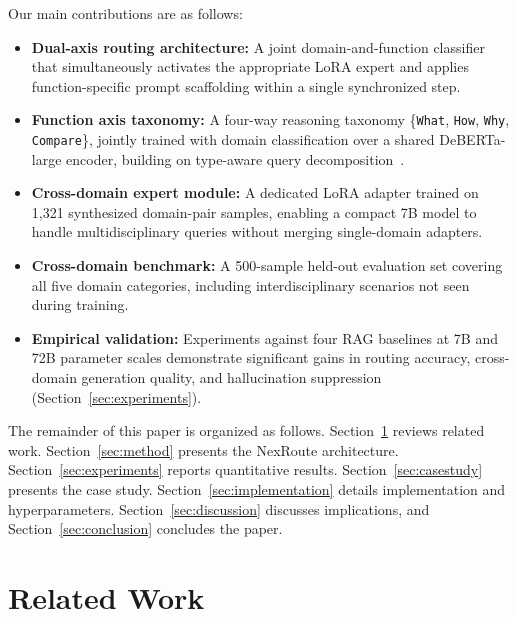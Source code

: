 \documentclass[a4paper,fleql]{cas-sc}
\begin{document}
Our main contributions are as follows:
\begin{itemize}
    \item \textbf{Dual-axis routing architecture:} A joint domain-and-function
    classifier that simultaneously activates the appropriate LoRA expert and
    applies function-specific prompt scaffolding within a single synchronized
    step.

    \item \textbf{Function axis taxonomy:} A four-way reasoning taxonomy
    \{\texttt{What}, \texttt{How}, \texttt{Why}, \texttt{Compare}\}, jointly
    trained with domain classification over a shared DeBERTa-large encoder,
    building on type-aware query decomposition~\citep{typedrag}.

    \item \textbf{Cross-domain expert module:} A dedicated LoRA adapter
    trained on 1,321 synthesized domain-pair samples, enabling a compact
    7B model to handle multidisciplinary queries without merging
    single-domain adapters.

    \item \textbf{Cross-domain benchmark:} A 500-sample held-out evaluation
    set covering all five domain categories, including interdisciplinary
    scenarios not seen during training.

    \item \textbf{Empirical validation:} Experiments against four RAG
    baselines at 7B and 72B parameter scales demonstrate significant gains
    in routing accuracy, cross-domain generation quality, and hallucination
    suppression (Section~\ref{sec:experiments}).
\end{itemize}

The remainder of this paper is organized as follows.
Section~\ref{sec:related} reviews related work.
Section~\ref{sec:method} presents the NexRoute architecture.
Section~\ref{sec:experiments} reports quantitative results.
Section~\ref{sec:casestudy} presents the case study.
Section~\ref{sec:implementation} details implementation and hyperparameters.
Section~\ref{sec:discussion} discusses implications, and
Section~\ref{sec:conclusion} concludes the paper.

\section{Related Work}
\label{sec:related}
\end{document}
